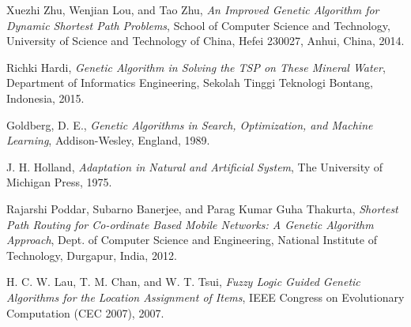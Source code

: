 \documentclass[journal]{IEEEtran}
\begin{document}
\begin{thebibliography}{5}

Xuezhi Zhu, Wenjian Lou, and Tao Zhu,
\textit{An Improved Genetic Algorithm for Dynamic Shortest Path Problems},
School of Computer Science and Technology, University of Science and Technology of China, Hefei 230027, Anhui, China, 2014.

Richki Hardi,
\textit{Genetic Algorithm in Solving the TSP on These Mineral Water},
Department of Informatics Engineering, Sekolah Tinggi Teknologi Bontang, Indonesia, 2015.

Goldberg, D. E.,
\textit{Genetic Algorithms in Search, Optimization, and Machine Learning},
Addison-Wesley, England, 1989.

J. H. Holland,
\textit{Adaptation in Natural and Artificial System},
The University of Michigan Press, 1975.

Rajarshi Poddar, Subarno Banerjee, and Parag Kumar Guha Thakurta,
\textit{Shortest Path Routing for Co-ordinate Based Mobile Networks: A Genetic Algorithm Approach},
Dept. of Computer Science and Engineering, National Institute of Technology, Durgapur, India, 2012.

H. C. W. Lau, T. M. Chan, and W. T. Tsui,
\textit{Fuzzy Logic Guided Genetic Algorithms for the Location Assignment of Items},
IEEE Congress on Evolutionary Computation (CEC 2007), 2007.

\end{thebibliography}
\end{document}
